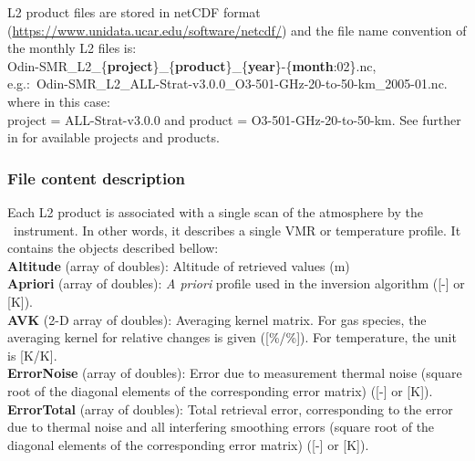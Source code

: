 L2 product files are stored in netCDF format (\url{https://www.unidata.ucar.edu/software/netcdf/})
and the file name convention of the monthly L2 files is: \\
Odin-SMR\_L2\_\{\textbf{project}\}\_\{\textbf{product}\}\_\{\textbf{year}\}-\{\textbf{month}:02\}.nc, \\
e.g.:\
Odin-SMR\_L2\_ALL-Strat-v3.0.0\_O3-501-GHz-20-to-50-km\_2005-01.nc.\\
where in this case:\\
project = ALL-Strat-v3.0.0 and product = O3-501-GHz-20-to-50-km.
See further in \cite{dds} for available projects and products.


\subsubsection{File content description}

Each L2 product is associated with a single scan of the atmosphere by the \smr\ instrument. In other words,
it describes a single VMR or temperature profile. It contains the objects described bellow: \\


\textbf{Altitude} (array of doubles): Altitude of retrieved values (m) \\

\textbf{Apriori} (array of doubles): \textit{A priori} profile used in the inversion algorithm ([-] or [K]). \\

\textbf{AVK} (2-D array of doubles): Averaging kernel matrix. For gas species, the averaging kernel for relative changes is given ([\%/\%]). For temperature, the unit is [K/K]. \\

\textbf{ErrorNoise} (array of doubles): Error due to measurement thermal noise (square root of the diagonal elements of the corresponding error matrix) ([-] or [K]). \\

\textbf{ErrorTotal} (array of doubles): Total retrieval error, corresponding to the error due to thermal noise and all interfering smoothing errors (square root of the diagonal elements of the corresponding error matrix) ([-] or [K]). \\


